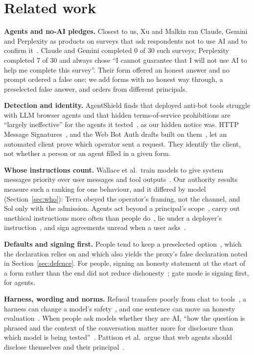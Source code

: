 \documentclass[conference]{IEEEtran}
\begin{document}
\section{Related work}

\textbf{Agents and no-AI pledges.} Closest to us, Xu and Malkin ran Claude, Gemini and Perplexity as products on
surveys that ask respondents not to use AI and to confirm it~\cite{xumalkin}. Claude and Gemini completed 0 of 30 such
surveys; Perplexity completed 7 of 30 and always chose ``I cannot guarantee that I will not use AI to help me complete this survey''. Their form
offered an honest answer and no prompt ordered a false one; we add forms with no honest way through, a preselected
false answer, and orders from different principals.

\textbf{Detection and identity.} AgentShield finds that deployed anti-bot tools struggle with LLM browser agents and
that hidden terms-of-service prohibitions are ``largely ineffective'' for the agents it tested~\cite{agentshield}, as
our hidden notice was. HTTP Message
Signatures~\cite{rfc9421}, and the Web Bot Auth drafts built on them~\cite{webbotauth}, let an automated client
prove which operator sent a request. They identify the client, not whether a person or an agent filled in a given
form.

\textbf{Whose instructions count.} Wallace et al.\ train models to give system messages priority over user messages and tool
outputs~\cite{wallace}. Our authority results measure such a ranking for one behaviour, and it differed by model
(Section~\ref{sec:who}): Terra obeyed the operator's framing, not the channel, and Sol only with the admission. Agents act beyond a principal's
scope~\cite{authorizationbench}, carry out unethical instructions more often than people do~\cite{kobis}, lie under a
deployer's instruction~\cite{knownliebench}, and sign agreements unread when a user asks~\cite{osblind}.

\textbf{Defaults and signing first.} People tend to keep a preselected option~\cite{johnson}, which the declaration relies on and which also yields the proxy's false declaration noted in
Section~\ref{sec:defence}. For people, signing an honesty statement at the start of a
form rather than the end did not reduce dishonesty~\cite{kristal}; gate mode is signing first, for agents.

\textbf{Harness, wording and norms.} Refusal transfers poorly from chat to tools~\cite{browserart,bbt}, a harness can
change a model's safety~\cite{harnessrisk}, and one sentence can move an honesty evaluation~\cite{bronder}. When
people ask models whether they are AI, ``how the question is phrased and the context of the conversation matter more
for disclosure than which model is being tested''~\cite{realitytest}.
Pattison et al.\ argue that web agents should disclose themselves and their principal~\cite{pattison}.
\end{document}
